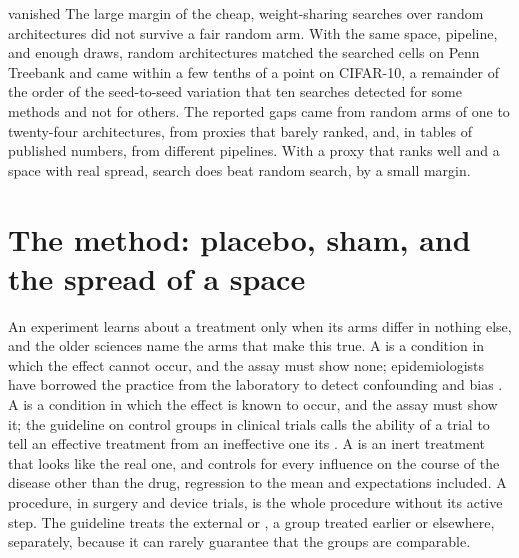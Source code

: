\begin{refsection}
\begin{verdict}{vanished}
The large margin of the cheap, weight-sharing searches over random architectures did not survive a fair random arm. With the same space, pipeline, and enough draws, random architectures matched the searched cells on Penn Treebank and came within a few tenths of a point on CIFAR-10, a remainder of the order of the seed-to-seed variation that ten searches detected for some methods and not for others. The reported gaps came from random arms of one to twenty-four architectures, from proxies that barely ranked, and, in tables of published numbers, from different pipelines. With a proxy that ranks well and a space with real spread, search does beat random search, by a small margin.
\end{verdict}

\section{The method: placebo, sham, and the spread of a space}\label{sec:controls:controls}

An experiment learns about a treatment only when its arms differ in nothing else, and the older sciences name the arms that make this true. A  is a condition in which the effect cannot occur, and the assay must show none; epidemiologists have borrowed the practice from the laboratory to detect confounding and bias \parencite{LipsitchEtAl2010}. A  is a condition in which the effect is known to occur, and the assay must show it; the guideline on control groups in clinical trials calls the ability of a trial to tell an effective treatment from an ineffective one its  \parencite{ICH2000}. A  is an inert treatment that looks like the real one, and controls for every influence on the course of the disease other than the drug, regression to the mean and expectations included. A  procedure, in surgery and device trials, is the whole procedure without its active step. The guideline treats the external or , a group treated earlier or elsewhere, separately, because it can rarely guarantee that the groups are comparable.


\end{refsection}
